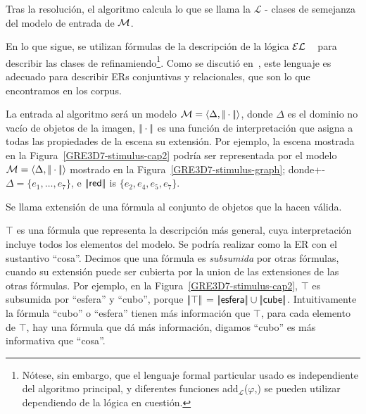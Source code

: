 

Tras la resoluci\'on, el algoritmo calcula lo que se llama la
$\mathcal{L}$ - clases de semejanza del modelo de entrada de $\mathcal{M}$.


En lo que sigue, se utilizan f\'ormulas de la descripci\'on de la l\'ogica $\mathcal{EL}$
~\cite{baad:desc03} para describir las clases de refinamiendo\footnote{N\'otese, sin embargo, que el lenguaje formal particular usado es
   independiente del algoritmo principal, y diferentes funciones
  add$_{\mathcal{L}}$($\varphi$,\RE) se pueden utilizar dependiendo
   de la l\'ogica en cuesti\'on.}. Como se discuti\'o 
en~\cite{arec2:2008:Areces}, 
este lenguaje es adecuado para describir
ERs conjuntivas y relacionales, que son lo que encontramos en los corpus.

  La entrada al algoritmo ser\'a un modelo $\mathcal{M} =
 \langle \Delta, |\!|\cdot|\!| \rangle$, donde $\Delta$ es el dominio no vac\'io de objetos de la imagen,
 $|\!|\cdot|\!|$ es una funci\'on de interpretaci\'on que asigna a todas las propiedades de la escena su extensi\'on.
 Por ejemplo, la escena mostrada en la Figura~\ref{GRE3D7-stimulus-cap2} podr\'ia ser representada por el modelo
 $\mathcal{M}=\langle \Delta,|\!|\cdot|\!| \rangle$ mostrado en la 
 Figura~\ref{GRE3D7-stimulus-graph}; donde+- $\Delta =
 \{e_1,\ldots,e_7\}$, e $|\!|\textsf{red}|\!|$ is $\{e_2, e_4, e_5,
 e_7\}$.

Se llama extensi\'on de una f\'ormula al conjunto de objetos que la hacen v\'alida.

$\top$ es una f\'ormula que representa la descripci\'on m\'as general, cuya
interpretaci\'on incluye todos los elementos del modelo. Se podr\'ia realizar
como la ER con el sustantivo
``\textsf{cosa}''. Decimos que una f\'ormula es
\emph{subsumida} por otras f\'ormulas, cuando su extensi\'on puede ser cubierta por la
union de las extensiones de las otras f\'ormulas. Por ejemplo, en la
Figura~\ref{GRE3D7-stimulus-cap2}, $\top$ es subsumida por ``\textsf{esfera}'' y
``\textsf{cubo}'', porque $|\!|\top|\!|$ = $|\!|\textsf{esfera}|\!|
\cup |\!|\textsf{cube}|\!|$.
Intuitivamente la f\'ormula ``\textsf{cubo}'' o ``\textsf{esfera}'' tienen m\'as informaci\'on que $\top$, para cada elemento de $\top$, hay una f\'ormula que d\'a m\'as informaci\'on, digamos ``\textsf{cubo}'' es m\'as informativa que ``\textsf{cosa}''.\\

